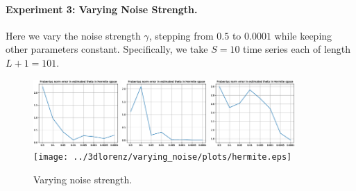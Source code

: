 \documentclass{article}
\begin{document}
\paragraph{Experiment 3: Varying Noise Strength.} Here we vary the noise strength $\gamma$, stepping from $0.5$ to $0.0001$ while keeping other parameters constant.  Specifically, we take $S=10$ time series each of length $L+1 = 101$.
\begin{figure}[th]
\includegraphics[height=1in]{../1dcode/varying_noise/plots/hermite.eps}
\includegraphics[height=1in]{../2dcode/varying_noise/plots/hermite.eps}
\includegraphics[height=1in]{../3ddampedduffing/varying_noise/plots/hermite.eps}
\texttt{[image: ../3dlorenz/varying\_noise/plots/hermite.eps]}
\caption{Varying noise strength.}
\label{fig:exp2}
\end{figure}
\end{document}
